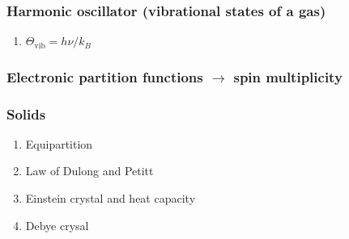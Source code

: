 \documentclass[11pt]{article}
\begin{document}
\subsubsection{Harmonic oscillator (vibrational states of a gas)}
\label{sec:orgb76ae4b}
\begin{enumerate}
\item \(\Theta_\mathrm{vib}=h\nu/k_B\)
\end{enumerate}
\subsubsection{Electronic partition functions \(\rightarrow\) spin multiplicity}
\label{sec:org9b2961b}
\subsubsection{Solids}
\label{sec:orgdb7afd1}
\begin{enumerate}
\item Equipartition
\item Law of Dulong and Petitt
\item Einstein crystal and heat capacity
\item Debye crysal
\end{enumerate}
\end{document}
